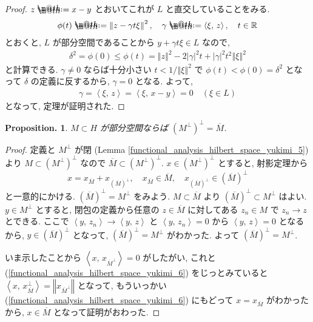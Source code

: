 \documentclass[openany, a4paper, oneside]{jsbook}
\makeatletter
\newcommand*{\defeq}{\mathrel{\rlap{%
\raisebox{0.3ex}{$\m@th\cdot$}}%
\raisebox{-0.3ex}{$\m@th\cdot$}}%
=}
\theoremstyle{break}
\theoremstyle{breakdefn}
\newtheorem{prop}[thm]{Proposition.}
\newcommand{\abs}[1]{\left|#1\right|}
\newcommand{\norm}[1]{\left\Vert#1\right\Vert}
\newcommand{\rbk}[1]{\left (#1\right)}
\newcommand{\bkt}[2]{\left\langle#1,\,#2\right\rangle}
\makeatother
\begin{document}
\begin{proof}
$z \defeq x - y$ とおいてこれが $L$ と直交していることをみる.
\begin{align}
 \phi(t)
 \defeq
 \norm{z - \gamma t \xi}^2, \quad
 \gamma \defeq \bkt{\xi}{z}, \quad
 t\in \mathbb{R}
\end{align}
とおくと, $L$ が部分空間であることから $y + \gamma t\xi \in L$ なので,
\begin{align}
 \delta^2
 =
 \phi (0)
 \leq
 \phi (t)
 =
 \norm{z}^2 - 2 \abs{\gamma}^2 t + \abs{\gamma}^2 t^2 \norm{\xi}^2
\end{align}
と計算できる.
$\gamma \neq 0$ ならば十分小さい $t < 1 / \norm{\xi}^2$ で
$\phi (t) < \phi (0) = \delta^2$ となって $\delta$ の定義に反するから, $\gamma = 0$ となる.
よって,
\begin{align}
 \gamma
 =
 \bkt{\xi}{z}
 =
 \bkt{\xi}{x - y}
 =
 0 \quad \rbk{\xi \in L}
\end{align}
となって, 定理が証明された.
\end{proof}
\begin{prop}\label{functional_analysis_hilbert_space_yukimi_13}
 $M \subset H$ が部分空間ならば $(M^{\perp})^{\perp} = \overline{M}$.
\end{prop}
\begin{proof}
定義と $M^{\perp}$ が閉 (Lemma \ref{functional_analysis_hilbert_space_yukimi_5}) より
$M \subset (M^\perp)^\perp$ なので $\overline{M} \subset (M^\perp)^\perp$.
$x \in (M^\perp)^\perp$ とすると, 射影定理から
\begin{equation}
 x
 =
 x_{\overline{M}} + x_{(\overline{M})^\perp}, \quad
 x_{\overline{M}}\in \overline{M}, \quad
 x_{(\overline{M})^\perp} \in (\overline{M})^\perp \label{functional_analysis_hilbert_space_yukimi_6}
\end{equation}
と一意的にかける.
$(\overline{M})^\perp = M^\perp$ をみよう.
$M \subset \overline{M}$ より $(\overline{M})^\perp \subset M^\perp$ はよい.
$y \in M^\perp$ とすると, 閉包の定義から任意の $z \in \overline{M}$ に対してある
$z_{n} \in M$ で $z_{n} \to z$ とできる.
ここで $\bkt{y}{z_n} \to \bkt{y}{z}$ と $\bkt{y}{z_n} = 0$ から $\bkt{y}{z} = 0$ となるから,
$y \in (\overline{M})^\perp$ となって, $(\overline{M})^\perp = M^\perp$ がわかった.
よって $(\overline{M})^\perp = M^\perp$.

いま示したことから $\bkt{x}{x_{\overline{M}^{\perp}}} = 0$ がしたがい, これと (\ref{functional_analysis_hilbert_space_yukimi_6})
をじっとみていると $\bkt{x}{x_{\overline{M}}^{\perp}} = \norm{x_{\overline{M}^{\perp}}}$ となって,
もういっかい (\ref{functional_analysis_hilbert_space_yukimi_6}) にもどって
$x = x_{\overline{M}}$ がわかったから, $x \in \overline{M}$ となって証明がおわった.
\end{proof}
\end{document}
